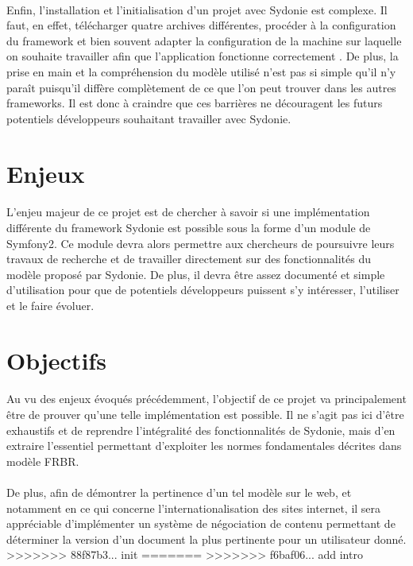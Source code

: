         \paragraph{}
        Enfin, l'installation et l'initialisation d'un projet avec Sydonie est complexe. Il faut, en effet, télécharger quatre archives différentes, procéder à la configuration du framework et bien souvent adapter la configuration de la machine sur laquelle on souhaite travailler afin que l'application fonctionne correctement . De plus, la prise en main et la compréhension du modèle utilisé n'est pas si simple qu'il n'y paraît puisqu'il diffère complètement de ce que l'on peut trouver dans les autres frameworks. Il est donc à craindre que ces barrières ne découragent les futurs potentiels développeurs souhaitant travailler avec Sydonie.

    \section{Enjeux}
        \paragraph{}
        L'enjeu majeur de ce projet est de chercher à savoir si une implémentation différente du framework Sydonie est possible sous la forme d'un module de Symfony2. Ce module devra alors permettre aux chercheurs de poursuivre leurs travaux de recherche et de travailler directement sur des fonctionnalités du modèle proposé par Sydonie. De plus, il devra être assez documenté et simple d'utilisation pour que de potentiels développeurs puissent s'y intéresser, l'utiliser et le faire évoluer.

    \section{Objectifs}
        \paragraph{}
        Au vu des enjeux évoqués précédemment, l'objectif de ce projet va principalement être de prouver qu'une telle implémentation est possible. Il ne s'agit pas ici d'être exhaustifs et de reprendre l'intégralité des fonctionnalités de Sydonie, mais d'en extraire l'essentiel permettant d'exploiter les normes fondamentales décrites dans modèle FRBR.

        \paragraph{}
        De plus, afin de démontrer la pertinence d'un tel modèle sur le web, et notamment en ce qui concerne l'internationalisation des sites internet, il sera appréciable d'implémenter un système de négociation de contenu permettant de déterminer la version d'un document la plus pertinente pour un utilisateur donné.
>>>>>>> 88f87b3... init
=======
>>>>>>> f6baf06... add intro
